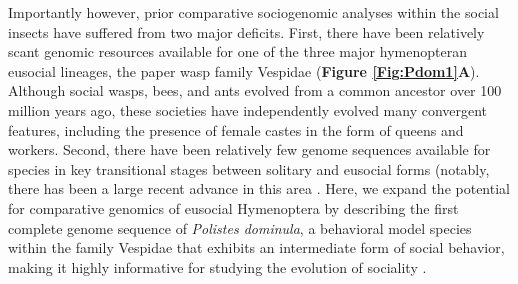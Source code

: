 Importantly however, prior comparative sociogenomic analyses within the
social insects have suffered from two major deficits. First, there have
been relatively scant genomic resources available for one of the three
major hymenopteran eusocial lineages, the paper wasp family Vespidae
(\textbf{Figure \ref{Fig:Pdom1}A}). Although social wasps, bees, and ants evolved from
a common ancestor over 100 million years ago, these societies have
independently evolved many convergent features, including the presence
of female castes in the form of queens and workers. Second, there have
been relatively few genome sequences available for species in key
transitional stages between solitary and eusocial forms (notably, there
has been a large recent advance in this area \cite{KapheimTenBee,Kocher2013,PcanGenome,Sadd2015}. Here, we
expand the potential for comparative genomics of eusocial Hymenoptera by
describing the first complete genome sequence of \textit{Polistes
dominula}, a behavioral model species within the family Vespidae that
exhibits an intermediate form of social behavior, making it highly
informative for studying the evolution of sociality \cite{JandtToth2015}.

